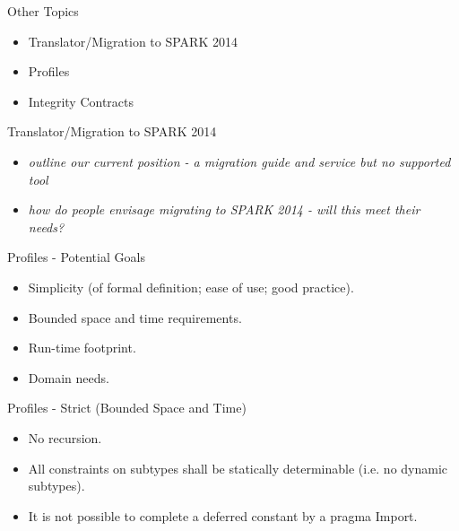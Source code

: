 \documentclass{beamer}
\begin{document}
\begin{frame}{Other Topics}

  \begin{itemize}

  \item Translator/Migration to SPARK 2014
  \item Profiles
  \item Integrity Contracts

  \end{itemize}

\end{frame}

\begin{frame}{Translator/Migration to SPARK 2014}

  \begin{itemize}

  \item \emph{outline our current position - a migration guide and service but no supported tool}
  \item \emph{how do people envisage migrating to SPARK 2014 - will this meet their needs?}

  \end{itemize}

\end{frame}

\begin{frame}{Profiles - Potential Goals}

  \begin{itemize}

  \item Simplicity (of formal definition; ease of use; good practice).

  \item Bounded space and time requirements.

  \item Run-time footprint.

  \item Domain needs.

  \end{itemize}

\end{frame}

\begin{frame}{Profiles - Strict (Bounded Space and Time)}

  \begin{itemize}

  \item No recursion.

  \item All constraints on subtypes shall be statically determinable
        (i.e. no dynamic subtypes).

  \item It is not possible to complete a deferred constant by a pragma Import.

  \end{itemize}
\end{frame}
\end{document}
